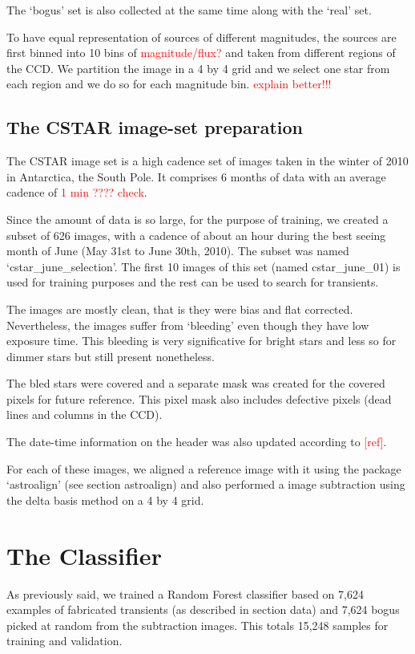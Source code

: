 The `bogus' set is also collected at the same time along with the `real' set.

To have equal representation of sources of different magnitudes, the sources are first binned into 10 bins of \textcolor{red}{magnitude/flux?} and taken from different regions of the CCD.
We partition the image in a 4 by 4 grid and we select one star from each region and we do so for each magnitude bin. \textcolor{red}{explain better!!!}

\subsection{The CSTAR image-set preparation}

The CSTAR image set is a high cadence set of images taken in the winter of 2010 in Antarctica, the South Pole. It comprises 6 months of data with an average cadence of \textcolor{red}{1 min ???? check}.

Since the amount of data is so large, for the purpose of training, we created a subset of 626 images, with a cadence of about an hour during the best seeing month of June (May 31st to June 30th, 2010). The subset was named `cstar\_june\_selection'. The first 10 images of this set (named cstar\_june\_01) is used for training purposes and the rest can be used to search for transients. 

The images are mostly clean, that is they were bias and flat corrected.
Nevertheless, the images suffer from `bleeding' even though they have low exposure time. This bleeding is very significative for bright stars and less so for dimmer stars but still present nonetheless.

The bled stars were covered and a separate mask was created for the covered pixels for future reference. This pixel mask also includes defective pixels (dead lines and columns in the CCD).

The date-time information on the header was also updated according to \textcolor{red}{[ref]}.

For each of these images, we aligned a reference image with it using the package `astroalign' (see section astroalign) and also performed a image subtraction using the delta basis method on a 4 by 4 grid.

\section{The Classifier}

As previously said, we trained a Random Forest classifier based on 7,624 examples of fabricated transients (as described in section data) and 7,624 bogus picked at random from the subtraction images. This totals 15,248 samples for training and validation.

